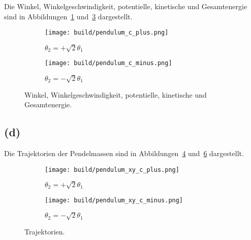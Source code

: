 \documentclass{scrartcl}
\begin{document}
Die Winkel, Winkelgeschwindigkeit, potentielle, kinetische und Gesamtenergie sind in
Abbildungen~\ref{fig:cp} und~\ref{fig:cm} dargestellt.
\begin{figure}[ht]
  \centering
  \begin{subfigure}{0.8\textwidth}
    \centering
    \texttt{[image: build/pendulum\_c\_plus.png]}
    \caption{$\theta_2 = +\sqrt{2}\theta_1$}
    \label{fig:cp}
  \end{subfigure}

  \begin{subfigure}{0.8\textwidth}
    \centering
    \texttt{[image: build/pendulum\_c\_minus.png]}
    \caption{$\theta_2 = -\sqrt{2}\theta_1$}
    \label{fig:cm}
  \end{subfigure}
  \caption{Winkel, Winkelgeschwindigkeit, potentielle, kinetische und Gesamtenergie.}
\end{figure}

\subsection*{(d)}
Die Trajektorien der Pendelmassen sind in Abbildungen~\ref{fig:dp} und~\ref{fig:dm} dargestellt.
\begin{figure}[ht]
  \centering
  \begin{subfigure}{0.8\textwidth}
    \centering
    \texttt{[image: build/pendulum\_xy\_c\_plus.png]}
    \caption{$\theta_2 = +\sqrt{2}\theta_1$}
    \label{fig:dp}
  \end{subfigure}

  \begin{subfigure}{0.8\textwidth}
    \centering
    \texttt{[image: build/pendulum\_xy\_c\_minus.png]}
    \caption{$\theta_2 = -\sqrt{2}\theta_1$}
    \label{fig:dm}
  \end{subfigure}
  \caption{Trajektorien.}
\end{figure}
\end{document}
